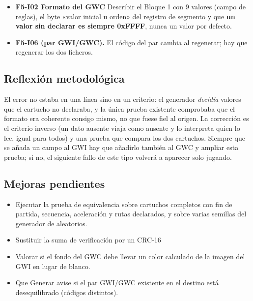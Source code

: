 \begin{itemize}
	\item \textbf{F5-I02 Formato del GWC} Describir el Bloque 1 con 9 valores (campo de reglas), el byte «valor inicial u orden» del registro de segmento y que \textbf{un valor sin declarar es siempre 0xFFFF}, nunca un valor por defecto.
	\item \textbf{F5-I06 (par GWI/GWC).} El código del par cambia al regenerar; hay que regenerar los dos ficheros.
\end{itemize}

\subsection{Reflexión metodológica}
\label{sec:F5I13Reflexion}

El error no estaba en una línea sino en un criterio: el generador \emph{decidía} valores que el cartucho no declaraba, y la única prueba existente comprobaba que el formato era coherente consigo mismo, no que fuese fiel al origen. La corrección es el criterio inverso (un dato ausente viaja como ausente y lo interpreta quien lo lee, igual para todos) y una prueba que compara los dos cartuchos. Siempre que se añada un campo al GWI hay que añadirlo también al GWC y ampliar esta prueba; si no, el siguiente fallo de este tipo volverá a aparecer solo jugando.

\subsection{Mejoras pendientes}
\label{sec:F5I13Pendientes}

\begin{itemize}
	\item Ejecutar la prueba de equivalencia sobre cartuchos completos con fin de partida, secuencia, aceleración y rutas declarados, y sobre varias semillas del generador de aleatorios.
	\item Sustituir la suma de verificación por un CRC-16 
	\item Valorar si el fondo del GWC debe llevar un color calculado de la imagen del GWI en lugar de blanco.
	\item Que Generar avise si el par GWI/GWC existente en el destino está desequilibrado (códigos distintos).
\end{itemize}
